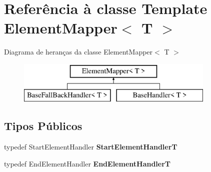 \hypertarget{class_element_mapper}{\section{Referência à classe Template Element\-Mapper$<$ T $>$}
\label{class_element_mapper}
}
Diagrama de heranças da classe Element\-Mapper$<$ T $>$\begin{figure}[H]
\begin{center}
\leavevmode
\includegraphics[height=2.000000cm]{class_element_mapper}
\end{center}
\end{figure}
\subsection*{Tipos Públicos}
\begin{DoxyCompactItemize}
\item 
\hypertarget{class_element_mapper_a7fbdca30fec26b41fcafe15f141eb0c3}{typedef Start\-Element\-Handler {\bfseries Start\-Element\-Handler\-T}}\label{class_element_mapper_a7fbdca30fec26b41fcafe15f141eb0c3}

\item 
\hypertarget{class_element_mapper_ab2b23b4cfde331e105a135c8a8bc822b}{typedef End\-Element\-Handler {\bfseries End\-Element\-Handler\-T}}\label{class_element_mapper_ab2b23b4cfde331e105a135c8a8bc822b}

\end{DoxyCompactItemize}
